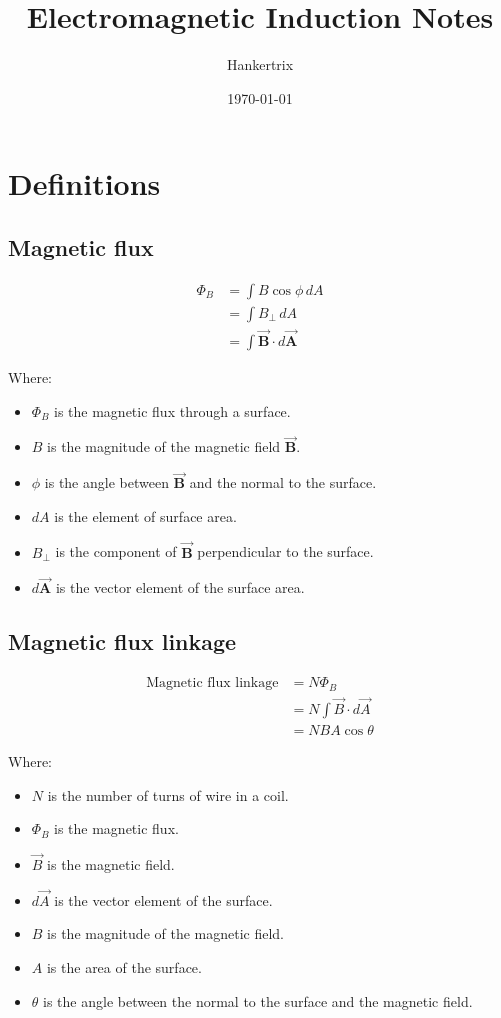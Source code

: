 \documentclass[11pt]{article}
\author{Hankertrix}
\date{\today}
\title{Electromagnetic Induction Notes}
\begin{document}
\maketitle
\setcounter{tocdepth}{2}
\tableofcontents \clearpage\section{Definitions}
\label{sec:org25aa164}

\subsection{Magnetic flux}
\label{sec:orgabf9afd}
\begin{align*}
\Phi_B &= \int B \cos \phi \, dA \\
&= \int B_{\perp} \, dA \\
&= \int \vec{\boldsymbol{B}} \cdot d \vec{\boldsymbol{A}}
\end{align*}

Where:
\begin{itemize}
\item \(\Phi_B\) is the magnetic flux through a surface.
\item \(B\) is the magnitude of the magnetic field \(\vec{\boldsymbol{B}}\).
\item \(\phi\) is the angle between \(\vec{\boldsymbol{B}}\) and the normal to the surface.
\item \(dA\) is the element of surface area.
\item \(B_{\perp}\) is the component of \(\vec{\boldsymbol{B}}\) perpendicular to the surface.
\item \(d \vec{\boldsymbol{A}}\) is the vector element of the surface area.
\end{itemize}
\subsection{Magnetic flux linkage}
\label{sec:org5c0fbb9}
\begin{align*}
\text{Magnetic flux linkage} &= N \Phi_B \\
&= N \int \vec{B} \cdot d \vec{A} \\
&= NBA \cos \theta
\end{align*}

Where:
\begin{itemize}
\item \(N\) is the number of turns of wire in a coil.
\item \(\Phi_B\) is the magnetic flux.
\item \(\vec{B}\) is the magnetic field.
\item \(d \vec{A}\) is the vector element of the surface.
\item \(B\) is the magnitude of the magnetic field.
\item \(A\) is the area of the surface.
\item \(\theta\) is the angle between the normal to the surface and the magnetic field.
\end{itemize}
\end{document}
